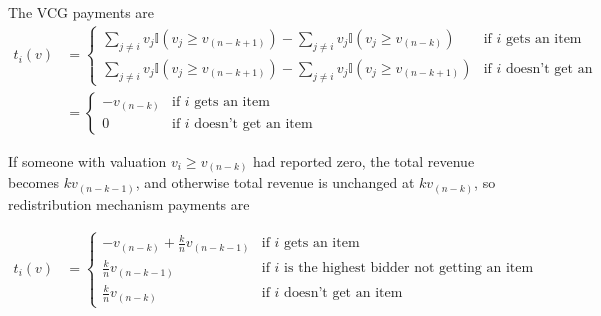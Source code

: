 \documentclass[letter, 10pt]{article}
\theoremstyle{basic}
\begin{document}
\begin{spacing}{1.0}
\begin{enumerate}
  The VCG payments are
  \begin{align*}
    t_i(v) &=
      \begin{cases}
        \sum_{j \ne i} v_j \mathbb{I}(v_j \ge v_{(n-k+1)}) - \sum_{j \ne i}
        v_j \mathbb{I}(v_j \ge v_{(n-k)}) & \mbox{if $i$ gets an item} \\
        \sum_{j \ne i} v_j \mathbb{I}(v_j \ge v_{(n-k+1)}) - \sum_{j \ne i}
        v_j \mathbb{I}(v_j \ge v_{(n-k+1)}) & \mbox{if $i$ doesn't get
          an item}
      \end{cases} \\
      & =
      \begin{cases}
        -v_{(n-k)} & \mbox{if $i$ gets an item} \\
        0 & \mbox{if $i$ doesn't get an item}
      \end{cases}
  \end{align*}

  If someone with valuation $v_i \ge v_{(n-k)}$ had reported zero, the
  total revenue becomes $k v_{(n-k-1)}$, and otherwise total revenue is
  unchanged at $k v_{(n-k)}$, so redistribution mechanism payments are

  \begin{align*}
    t_i(v) &=
      \begin{cases}
        - v_{(n-k)} + \frac{k}{n} v_{(n-k-1)} & \mbox{if $i$ gets an item} \\
        \frac{k}{n} v_{(n-k-1)} & \mbox{if $i$ is the highest bidder not
          getting an item} \\
        \frac{k}{n} v_{(n-k)} & \mbox{if $i$ doesn't get an item}
      \end{cases}
  \end{align*}

\end{enumerate}

\end{spacing}
\end{document}
